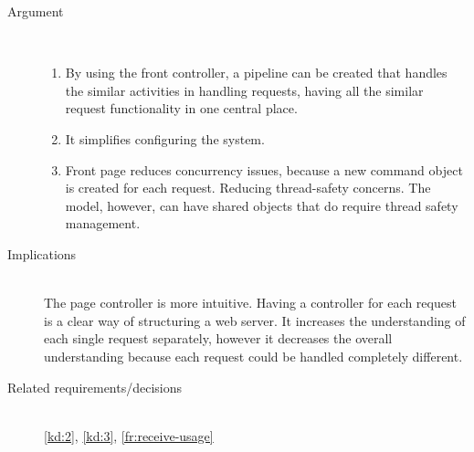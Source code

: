\begin{description}
\item [Argument]~
\begin{enumerate}
\item By using the front controller, a pipeline can be created that handles the similar activities in handling requests, having all the similar request functionality in one central place.
\item It simplifies configuring the system.
\item Front page reduces concurrency issues, because a new command object is created for each request. Reducing thread-safety concerns. The model, however, can have shared objects that do require thread safety management.
\end{enumerate}

\item [Implications]~\\
The page controller is more intuitive. Having a controller for each request is a clear way of structuring a web server. It increases the understanding of each single request separately, however it decreases the overall understanding because each request could be handled completely different.

\item [Related requirements/decisions]~\\
\ref{kd:2}, \ref{kd:3}, \ref{fr:receive-usage}

\end{description}

%
